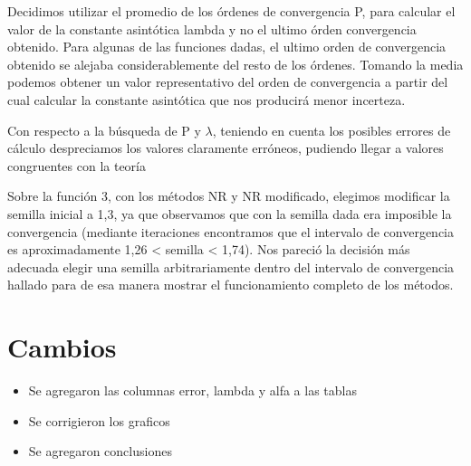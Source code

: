 \documentclass[titlepage,a4paper]{article}
\begin{document}
Decidimos utilizar el promedio de los órdenes de convergencia P, para calcular el valor de la constante asintótica lambda y no el ultimo órden convergencia obtenido. Para algunas de las funciones dadas, el ultimo orden de convergencia obtenido se alejaba considerablemente del resto de los órdenes. Tomando la media podemos obtener un valor representativo del orden de convergencia a partir del cual calcular la constante asintótica que nos producirá menor incerteza.  
 
Con respecto a la búsqueda de P y $\lambda$, teniendo en cuenta los posibles errores de cálculo despreciamos los valores claramente erróneos, pudiendo llegar a valores congruentes con la teoría

Sobre la función 3, con los métodos NR y NR modificado, elegimos modificar la semilla inicial a 1,3, ya que observamos que con la semilla dada era imposible la convergencia (mediante iteraciones encontramos que el intervalo de convergencia es aproximadamente 1,26 < semilla < 1,74). Nos pareció la decisión más adecuada elegir una semilla arbitrariamente dentro del intervalo de convergencia hallado para de esa manera mostrar el funcionamiento completo de los métodos.

\section{Cambios}\label{sec:cambios}
    \begin{itemize}
        \item Se agregaron las columnas error, lambda y alfa a las tablas
        \item Se corrigieron los graficos
	\item Se agregaron conclusiones
    \end{itemize}
\end{document}
